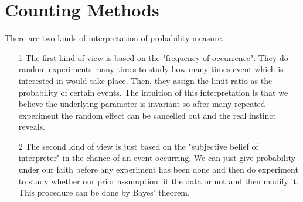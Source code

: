 \documentclass[11pt]{report}
\begin{document}
\section{Counting Methods}
  There are two kinds of interpretation of probability measure. 
\begin{enumerate}
\item[1]
  The first kind of view is based on the "frequency of occurrence". They do random experiments many times to study  how many times event which is interested in would take place. Then, they assign the limit ratio  as the probability of certain events. The intuition of this interpretation is that we believe the underlying parameter is invariant so after many repeated experiment the random effect can be cancelled out and the real instinct reveals. 
\item[2]
  The second kind of view is just based on the "subjective belief of interpreter" in the chance of an event occurring.  We can just give probability under our faith before any experiment has been done and then do experiment to study whether our prior assumption fit the data or not and then modify it. This procedure can be done by Bayes' theorem. 
\end{enumerate}
\end{document}
